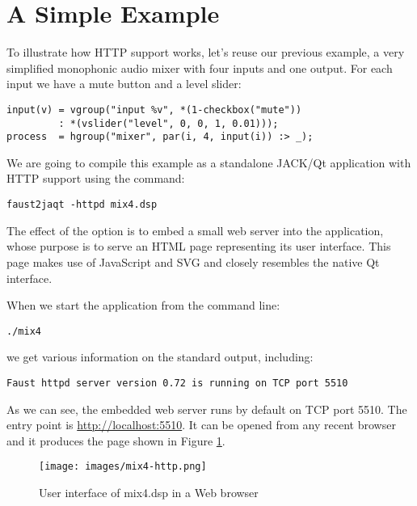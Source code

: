 \section{A Simple Example}

To illustrate how HTTP support works, let's reuse our previous  example, a very simplified monophonic audio mixer with four inputs and one output. For each input we have a mute button and a level slider:
\begin{lstlisting}
input(v) = vgroup("input %v", *(1-checkbox("mute")) 
         : *(vslider("level", 0, 0, 1, 0.01)));
process  = hgroup("mixer", par(i, 4, input(i)) :> _);
\end{lstlisting}

We are going to compile this example as a standalone JACK/Qt application with HTTP support using the command:
\begin{lstlisting}
faust2jaqt -httpd mix4.dsp
\end{lstlisting}
The effect of the  option is to embed a small web server into the application, whose purpose is to serve an HTML page representing its user interface. This page makes use of JavaScript and SVG and closely resembles the native Qt interface.

When we start the application from the command line:
\begin{lstlisting}
./mix4 
\end{lstlisting}
we get various information on the standard output, including:
\begin{lstlisting}
Faust httpd server version 0.72 is running on TCP port 5510
\end{lstlisting}

As we can see, the embedded web server runs by default on TCP port 5510. The entry point is \url{http://localhost:5510}. It can be opened from any recent browser and it produces the page shown in Figure \ref{fig:mix4-http}.


\begin{figure}[h!]
  \centering
  \texttt{[image: images/mix4-http.png]}
  \caption{User interface of mix4.dsp in a Web browser}   
  \label{fig:mix4-http}
\end{figure}

